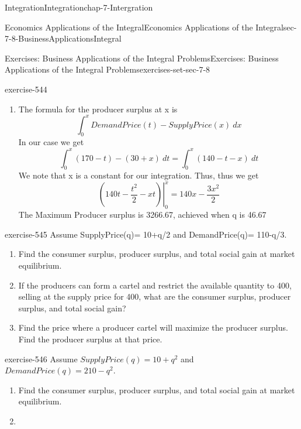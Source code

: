 \documentclass[oneside,10pt,]{book}
\numberwithin{equation}{section}
\begin{document}
\begin{chapterptx}{Integration}{}{Integration}{}{}{chap-7-Intergration}
\begin{sectionptx}{Economics Applications of the Integral}{}{Economics Applications of the Integral}{}{}{sec-7-8-BusinessApplicationsIntegral}
\begin{exercises-subsection-numberless}{Exercises: Business Applications of the Integral Problems}{}{Exercises: Business Applications of the Integral Problems}{}{}{exercises-set-sec-7-8}
\begin{divisionexercise}{7}{}{}{exercise-544}
\begin{enumerate}[label=(\alph*)]
%
\item\hypertarget{li-804}{}\hypertarget{p-3141}{}%
The formula for the producer surplus at x is%
%
\begin{equation*}
\int_0^x DemandPrice(t)-SupplyPrice(x)\ dx
\end{equation*}
\hypertarget{p-3142}{}%
In our case we get%
%
\begin{equation*}
\int_0^x (170-t)-(30+x) \ dt=\int_0^x(140-t-x) \ dt
\end{equation*}
\hypertarget{p-3143}{}%
We note that x is a constant for our integration.  Thus, thus we get%
%
\begin{equation*}
\left.\left({140t-\frac{t^2}{2}-xt}\right)\right|_0^x=140x-\frac{3x^2}{2}
\end{equation*}
\hypertarget{p-3144}{}%
The Maximum Producer surplus is 3266.67, achieved when q is 46.67%
\end{enumerate}
\end{divisionexercise}%
\begin{divisionexercise}{8}{}{}{exercise-545}%
\hypertarget{p-3145}{}%
Assume SupplyPrice(q)= 10+q\slash{}2 and DemandPrice(q)= 110-q\slash{}3.%
\leavevmode%
\begin{enumerate}[label=(\alph*)]
\item\hypertarget{li-805}{}\hypertarget{p-3146}{}%
Find the consumer surplus, producer surplus, and total social gain at market equilibrium.%
\item\hypertarget{li-806}{}\hypertarget{p-3147}{}%
If the producers can form a cartel and restrict the available quantity to 400, selling at the supply price for 400, what are the consumer surplus, producer surplus, and total social gain?%
\item\hypertarget{li-807}{}\hypertarget{p-3148}{}%
Find the price where a producer cartel will maximize the producer surplus.  Find the producer surplus at that price.%
\end{enumerate}
\end{divisionexercise}%
\begin{divisionexercise}{9}{}{}{exercise-546}%
\hypertarget{p-3149}{}%
Assume \(SupplyPrice(q)= 10+q^2\) and \(DemandPrice(q)= 210-q^2\).%
\leavevmode%
\begin{enumerate}[label=(\alph*)]
\item\hypertarget{li-808}{}\hypertarget{p-3150}{}%
Find the consumer surplus, producer surplus, and total social gain at market equilibrium.%
\item\hypertarget{li-809}{}\hypertarget{p-3151}{}%

\end{enumerate}
\end{divisionexercise}
\end{exercises-subsection-numberless}
\end{sectionptx}
\end{chapterptx}
\end{document}
